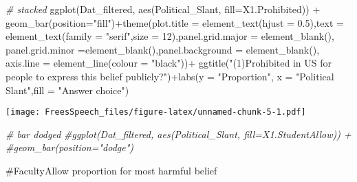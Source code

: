 \documentclass[
]{article}
\newenvironment{Shaded}{\begin{snugshade}}{\end{snugshade}}
\newcommand{\AttributeTok}[1]{\textcolor[rgb]{0.77,0.63,0.00}{#1}}
\newcommand{\CommentTok}[1]{\textcolor[rgb]{0.56,0.35,0.01}{\textit{#1}}}
\newcommand{\DecValTok}[1]{\textcolor[rgb]{0.00,0.00,0.81}{#1}}
\newcommand{\FloatTok}[1]{\textcolor[rgb]{0.00,0.00,0.81}{#1}}
\newcommand{\FunctionTok}[1]{\textcolor[rgb]{0.00,0.00,0.00}{#1}}
\newcommand{\NormalTok}[1]{#1}
\newcommand{\SpecialCharTok}[1]{\textcolor[rgb]{0.00,0.00,0.00}{#1}}
\newcommand{\StringTok}[1]{\textcolor[rgb]{0.31,0.60,0.02}{#1}}
\begin{document}
\begin{Shaded}
\begin{Highlighting}[]
\CommentTok{\# stacked}
\FunctionTok{ggplot}\NormalTok{(Dat\_filtered, }\FunctionTok{aes}\NormalTok{(Political\_Slant, }\AttributeTok{fill=}\NormalTok{X1.Prohibited)) }\SpecialCharTok{+} 
  \FunctionTok{geom\_bar}\NormalTok{(}\AttributeTok{position=}\StringTok{"fill"}\NormalTok{)}\SpecialCharTok{+}\FunctionTok{theme}\NormalTok{(}\AttributeTok{plot.title =} \FunctionTok{element\_text}\NormalTok{(}\AttributeTok{hjust =} \FloatTok{0.5}\NormalTok{),}\AttributeTok{text =} \FunctionTok{element\_text}\NormalTok{(}\AttributeTok{family =} \StringTok{"serif"}\NormalTok{,}\AttributeTok{size =} \DecValTok{12}\NormalTok{),}\AttributeTok{panel.grid.major =} \FunctionTok{element\_blank}\NormalTok{(), }\AttributeTok{panel.grid.minor =}\FunctionTok{element\_blank}\NormalTok{(),}\AttributeTok{panel.background =} \FunctionTok{element\_blank}\NormalTok{(), }\AttributeTok{axis.line =} \FunctionTok{element\_line}\NormalTok{(}\AttributeTok{colour =} \StringTok{"black"}\NormalTok{))}\SpecialCharTok{+}
\FunctionTok{ggtitle}\NormalTok{(}\StringTok{"(1)Prohibited in US for people to express this belief publicly?"}\NormalTok{)}\SpecialCharTok{+}\FunctionTok{labs}\NormalTok{(}\AttributeTok{y =} \StringTok{"Proportion"}\NormalTok{, }\AttributeTok{x =} \StringTok{"Political Slant"}\NormalTok{,}\AttributeTok{fill =} \StringTok{"Answer choice"}\NormalTok{)}
\end{Highlighting}
\end{Shaded}

\texttt{[image: FreesSpeech\_files/figure-latex/unnamed-chunk-5-1.pdf]}

\begin{Shaded}
\begin{Highlighting}[]
\CommentTok{\# bar dodged}
\CommentTok{\#ggplot(Dat\_filtered, aes(Political\_Slant, fill=X1.StudentAllow)) + }
  \CommentTok{\#geom\_bar(position="dodge")}
\end{Highlighting}
\end{Shaded}

\#FacultyAllow proportion for most harmful belief
\end{document}
